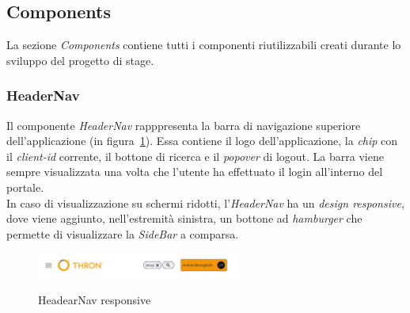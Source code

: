 \subsection{Components}\label{subsec:components}
La sezione \textit{Components} contiene tutti i componenti riutilizzabili creati durante lo sviluppo del progetto di stage.
\subsubsection{HeaderNav}\label{subsubsec:header-nav}
Il componente \textit{HeaderNav} rapppresenta la barra di navigazione superiore dell'applicazione (in figura~\ref{fig:header-nav-responsive}). Essa contiene il logo dell'applicazione, la \textit{chip} con il \textit{client-id}
corrente, il bottone di ricerca e il \textit{popover} di logout. 
La barra viene sempre visualizzata una volta che l'utente ha effettuato il login all'interno del portale.\\
In caso di visualizzazione su schermi ridotti, l'\textit{HeaderNav} ha un \textit{design responsive}, dove viene aggiunto, nell'estremità sinistra, un bottone ad \textit{hamburger}
che permette di visualizzare la \textit{SideBar} a comparsa.

\begin{figure}[ht]
  \centering
  \includegraphics[width=0.6\textwidth, alt={Barra di navigazione superiore con design responsive}]{images/frontend/HeaderRes.jpg}
  \caption{HeadearNav responsive}\label{fig:header-nav-responsive}
\end{figure}

